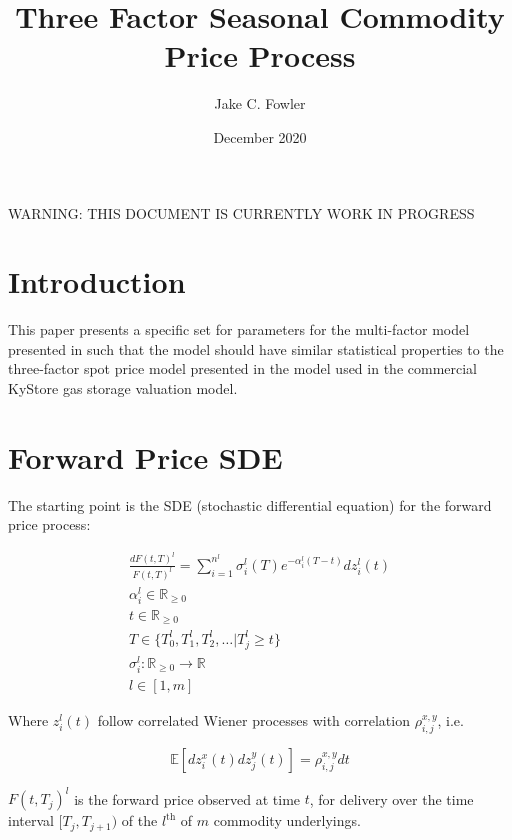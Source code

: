 \documentclass{article}
\title{Three Factor Seasonal Commodity Price Process}
\author{Jake C. Fowler}
\date{December 2020}
\begin{document}
\newcommand{\+}[1]{\ensuremath{\mathbf{#1}}}

\maketitle

WARNING: THIS DOCUMENT IS CURRENTLY WORK IN PROGRESS

\tableofcontents

\newpage

\section{Introduction}
This paper presents a specific set for parameters for the multi-factor model presented in \cite{Fowler}
such that the model should have similar statistical properties to the three-factor spot price
model presented in \cite{Boogert} the model used in the commercial KyStore gas storage valuation model. 


\section{Forward Price SDE}
The starting point is the SDE (stochastic differential equation) for the forward
price process:

\begin{align}
    \label{eq:general_forward_sde}
    \frac{dF(t, T)^l}{F(t, T)^l}=\sum_{i=1}^{n^l} \sigma_i^l(T)e^{-\alpha_i^l(T-t)}dz_i^l(t) \\
    \nonumber
    \alpha_i^l \in \mathbb{R}_{\ge 0} \\
    \nonumber
    t \in \mathbb{R}_{\ge 0} \\
    \nonumber
    T \in \{ T_0^l, T_1^l, T_2^l, \hdots | T_j^l \ge t  \} \\
    \nonumber
    \sigma_i^l : \mathbb{R}_{\ge 0} \rightarrow \mathbb{R} \\
    \nonumber
    l \in [1, m]
\end{align}

Where $z_i^l(t)$ follow correlated Wiener processes with correlation $\rho_{i, j}^{x, y}$, i.e.

\begin{equation}
    \mathbb{E}[dz_i^x(t)dz_j^y(t)] = \rho_{i, j}^{x, y}dt
\end{equation}

$F(t, T_j)^l$ is the forward price observed at time $t$, for delivery over the time 
interval $[T_j, T_{j+1})$ of the $l^{\text{th}}$ of $m$ commodity underlyings.
\end{document}
